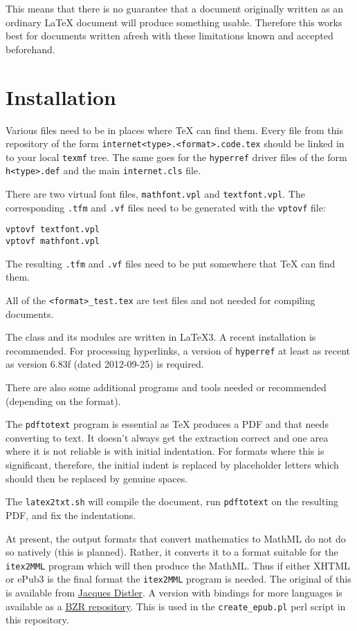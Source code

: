 \documentclass[github,text]{internet}
\begin{document}
This means that there is no guarantee that a document originally written as an ordinary \LaTeX{} document will produce something usable.
Therefore this works best for documents written afresh with these limitations known and accepted beforehand.

\section{Installation}

Various files need to be in places where \TeX{} can find them.
Every file from this repository of the form \verb+internet<type>.<format>.code.tex+ should be linked in to your local \verb+texmf+ tree.
The same goes for the \verb+hyperref+ driver files of the form \verb+h<type>.def+ and the main \verb+internet.cls+ file.

There are two virtual font files, \verb+mathfont.vpl+ and \verb+textfont.vpl+.
The corresponding \verb+.tfm+ and \verb+.vf+ files need to be generated with the \verb+vptovf+ file:

\begin{verbatim}
vptovf textfont.vpl
vptovf mathfont.vpl
\end{verbatim}

The resulting \verb+.tfm+ and \verb+.vf+ files need to be put somewhere that \TeX{} can find them.

All of the \verb+<format>_test.tex+ are test files and not needed for compiling documents.

The class and its modules are written in \LaTeX3.
A recent installation is recommended.
For processing hyperlinks, a version of \verb+hyperref+ at least as recent as version 6.83f (dated 2012-09-25) is required.

There are also some additional programs and tools needed or recommended (depending on the format).

The \verb+pdftotext+ program is essential as \TeX{} produces a PDF and that needs converting to text.
It doesn't always get the extraction correct and one area where it is not reliable is with initial indentation.
For formats where this is significant, therefore, the initial indent is replaced by placeholder letters which should then be replaced by genuine spaces.

The \verb+latex2txt.sh+ will compile the document, run \verb+pdftotext+ on the resulting PDF, and fix the indentations.

At present, the output formats that convert mathematics to MathML do not do so natively  (this is planned).
Rather, it converts it to a format suitable for the \verb+itex2MML+ program which will then produce the MathML.
Thus if either XHTML or ePub3 is the final format the \verb+itex2MML+ program is needed.
The original of this is available from \href{http://golem.ph.utexas.edu/~distler/blog/itex2MML.html}{Jacques Distler}.
A version with bindings for more languages is available as a  \href{http://www.math.ntnu.no/~stacey/code/itexToMML/}{BZR repository}.
This is used in the \verb+create_epub.pl+ perl script in this repository.
\end{document}
